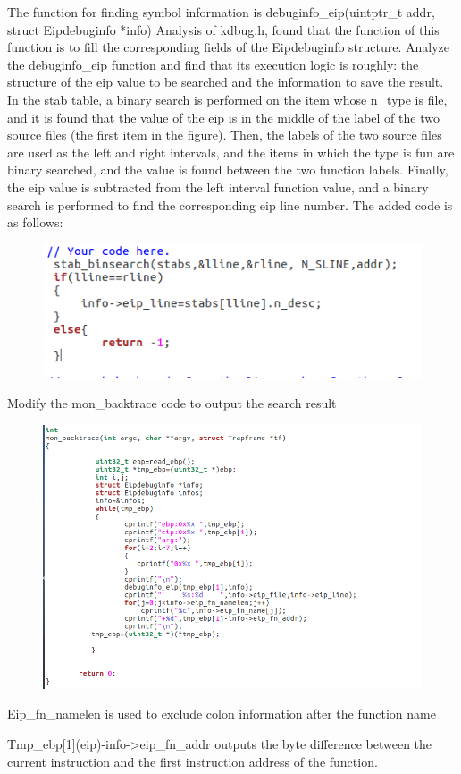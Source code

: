 The function for finding symbol information is debuginfo\_eip(uintptr\_t addr, struct Eipdebuginfo *info)
Analysis of kdbug.h, found that the function of this function is to fill the corresponding fields of the Eipdebuginfo structure.
Analyze the debuginfo\_eip function and find that its execution logic is roughly: the structure of the eip value to be searched and the information to save the result. In the stab table, a binary search is performed on the item whose n\_type is file, and it is found that the value of the eip is in the middle of the label of the two source files (the first item in the figure). Then, the labels of the two source files are used as the left and right intervals, and the items in which the type is fun are binary searched, and the value is found between the two function labels. Finally, the eip value is subtracted from the left interval function value, and a binary search is performed to find the corresponding eip line number.
The added code is as follows:
\begin{figure}[H]
  \centering
  \includegraphics[width=0.8\linewidth]{figure/challenge_2}
\end{figure}


Modify the mon\_backtrace code to output the search result
\begin{figure}[H]
  \centering
  \includegraphics[width=0.8\linewidth]{figure/challenge_3}
\end{figure}

Eip\_fn\_namelen is used to exclude colon information after the function name

Tmp\_ebp[1](eip)-info->eip\_fn\_addr outputs the byte difference between the current instruction and the first instruction address of the function.
\clearpage





























